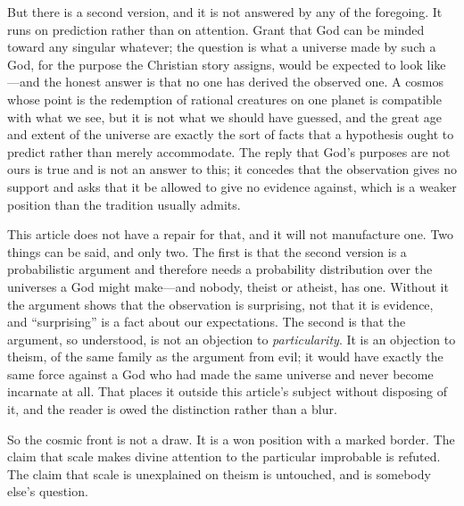 But there is a second version, and it is not answered by any of the foregoing. It runs on prediction rather than on attention. Grant that God can be minded toward any singular whatever; the question is what a universe made by such a God, for the purpose the Christian story assigns, would be expected to look like---and the honest answer is that no one has derived the observed one. A cosmos whose point is the redemption of rational creatures on one planet is compatible with what we see, but it is not what we should have guessed, and the great age and extent of the universe are exactly the sort of facts that a hypothesis ought to predict rather than merely accommodate. The reply that God's purposes are not ours is true and is not an answer to this; it concedes that the observation gives no support and asks that it be allowed to give no evidence against, which is a weaker position than the tradition usually admits.

This article does not have a repair for that, and it will not manufacture one. Two things can be said, and only two. The first is that the second version is a probabilistic argument and therefore needs a probability distribution over the universes a God might make---and nobody, theist or atheist, has one. Without it the argument shows that the observation is surprising, not that it is evidence, and ``surprising'' is a fact about our expectations. The second is that the argument, so understood, is not an objection to \emph{particularity}. It is an objection to theism, of the same family as the argument from evil; it would have exactly the same force against a God who had made the same universe and never become incarnate at all. That places it outside this article's subject without disposing of it, and the reader is owed the distinction rather than a blur.

So the cosmic front is not a draw. It is a won position with a marked border. The claim that scale makes divine attention to the particular improbable is refuted. The claim that scale is unexplained on theism is untouched, and is somebody else's question.

